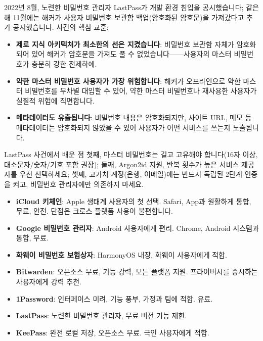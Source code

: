 
2022년 8월, 노련한 비밀번호 관리자 LastPass가 개발 환경 침입을 공시했습니다; 같은 해 11월에는 해커가 사용자 비밀번호 보관함 백업(암호화된 암호문)을 가져갔다고 추가 공시했습니다. 사건의 핵심 교훈:

\begin{itemize}
  \item \textbf{제로 지식 아키텍처가 최소한의 선은 지켰습니다}: 비밀번호 보관함 자체가 암호화되어 있어 해커가 암호문을 가져도 풀 수 없었습니다——사용자의 마스터 비밀번호가 충분히 강한 전제하에.
  \item \textbf{약한 마스터 비밀번호 사용자가 가장 위험합니다}: 해커가 오프라인으로 약한 마스터 비밀번호를 무차별 대입할 수 있어, 약한 마스터 비밀번호나 재사용한 사용자가 실질적 위험에 직면합니다.
  \item \textbf{메타데이터도 유출됩니다}: 비밀번호 내용은 암호화되지만, 사이트 URL, 메모 등 메타데이터는 암호화되지 않았을 수 있어 사용자가 어떤 서비스를 쓰는지 노출됩니다.
\end{itemize}

\begin{tcbwarn}{LastPass 사건에서 배운 점}
첫째, 마스터 비밀번호는 길고 고유해야 합니다(16자 이상, 대소문자/숫자/기호 포함 권장); 둘째, Argon2id 지원, 반복 횟수가 높은 서비스 제공자를 우선 선택하세요; 셋째, 고가치 계정(은행, 이메일)에는 반드시 독립된 2단계 인증을 켜고, 비밀번호 관리자에만 의존하지 마세요.

\end{tcbwarn}



\begin{itemize}
  \item \textbf{iCloud 키체인}: Apple 생태계 사용자의 첫 선택. Safari, App과 원활하게 통합, 무료, 안전. 단점은 크로스 플랫폼 사용이 불편합니다.
  \item \textbf{Google 비밀번호 관리자}: Android 사용자에게 편리. Chrome, Android 시스템과 통합, 무료.
  \item \textbf{화웨이 비밀번호 보험상자}: HarmonyOS 내장, 화웨이 사용자에게 적합.
\end{itemize}


\begin{itemize}
  \item \textbf{Bitwarden}: 오픈소스 무료, 기능 강력, 모든 플랫폼 지원. 프라이버시를 중시하는 사용자에게 강력 추천.
  \item \textbf{1Password}: 인터페이스 미려, 기능 풍부, 가정과 팀에 적합. 유료.
  \item \textbf{LastPass}: 노련한 비밀번호 관리자, 무료 버전 기능 제한.
  \item \textbf{KeePass}: 완전 로컬 저장, 오픈소스 무료. 극인 사용자에게 적합.
\end{itemize}

